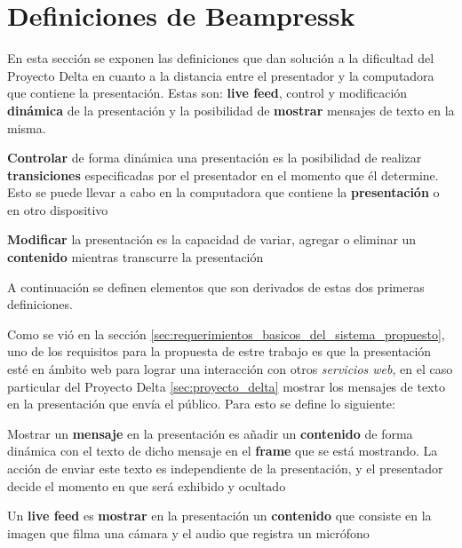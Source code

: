 	\section{Definiciones de Beampressk} %
	\label{sec:definiciones_de_beampressk}

		En esta sección se exponen las definiciones que dan solución a la dificultad del Proyecto Delta en cuanto a la distancia entre el presentador y la computadora que contiene la presentación. Estas son: \textbf{live feed}, control y modificación \textbf{dinámica} de la presentación y la posibilidad de \textbf{mostrar} mensajes de texto en la misma.

	\begin{definition}
		\textbf{Controlar} de forma dinámica una presentación es la posibilidad de realizar \textbf{transiciones} especificadas por el presentador en el momento que él determine. Esto se puede llevar a cabo en la computadora que contiene la \textbf{presentación} o en otro dispositivo
	\end{definition}

	\begin{definition}
		\textbf{Modificar} la presentación es la capacidad de variar, agregar o eliminar un \textbf{contenido} mientras transcurre la presentación
	\end{definition}

	A continuación se definen elementos que son derivados de estas dos primeras definiciones.

	Como se vió en la sección \ref{sec:requerimientos_basicos_del_sistema_propuesto}, uno de los requisitos para la propuesta de estre trabajo es que la presentación esté en ámbito web para lograr una interacción con otros \textit{servicios web}, en el caso particular del Proyecto Delta \ref{sec:proyecto_delta} mostrar los mensajes de texto en la presentación que envía el público. Para esto se define lo siguiente: 
	\begin{definition}
	\label{def:message}
		Mostrar un \textbf{mensaje} en la presentación es añadir un \textbf{contenido} de forma dinámica con el texto de dicho mensaje en el \textbf{frame} que se está mostrando. La acción de enviar este texto es independiente de la presentación, y el presentador decide el momento en que será exhibido y ocultado
	\end{definition}

	\begin{definition}
		Un \textbf{live feed} es \textbf{mostrar} en la presentación un \textbf{contenido} que consiste en la imagen que filma una cámara y el audio que registra un micrófono
	\end{definition}

